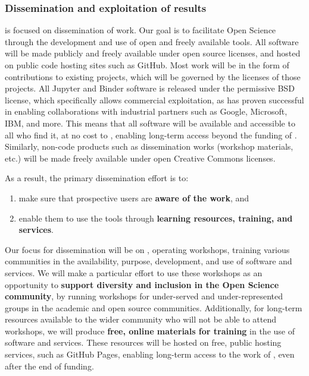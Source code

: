 \subsubsection{Dissemination and exploitation of results}

 is focused on dissemination of \TheProject work.
Our goal is to facilitate Open Science through the development and use of open and freely available tools.
All \TheProject software will be made publicly and freely available under open source licenses, and 
hosted on public code hosting sites such as GitHub.
Most \TheProject work will be in the form of
contributions to existing projects,
which will be governed by the licenses of those projects.
All Jupyter and Binder software is released under the permissive BSD license,
which specifically allows commercial exploitation,
as has proven successful in enabling collaborations with industrial partners
such as Google, Microsoft, IBM, and more.
This means that all \TheProject software will be available and accessible to all who find it,
at no cost to \TheProject,
enabling long-term access beyond the funding of \TheProject.
Similarly, non-code products such as dissemination works
(workshop materials, etc.)
will be made freely available under open Creative Commons licenses.

As a result, the primary dissemination effort is to:

\begin{enumerate}
  \item make sure that prospective users are \textbf{aware of the work}, and
  \item enable them to use the tools through \textbf{learning resources, training, and services}.
\end{enumerate}

Our focus for dissemination will be on ,
operating workshops, training various communities in the availability,
purpose, development, and use of \TheProject software and services.
We will make a particular effort to use these workshops as an opportunity
to \textbf{support diversity and inclusion in the Open Science community},
by running workshops for under-served and under-represented groups in the academic and 
open source communities.
Additionally, for long-term resources available to the wider community
who will not be able to attend workshops,
we will produce \textbf{free, online materials for training} in the use of \TheProject
software and services.
These resources will be hosted on free, public hosting services,
such as GitHub Pages,
enabling long-term access to the work of \TheProject,
even after the end of funding.

